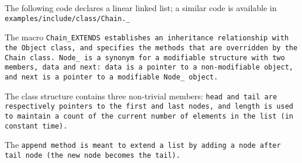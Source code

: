 The following code declares a linear linked list;
a similar code is available in \tt{examples/include/class/Chain._}


The macro \tt{Chain_EXTENDS} establishes an inheritance
relationship with the \tt{Object} class, and specifies
the methods that are overridden by the \tt{Chain} class.
\tt{Node_} is a synonym for a modifiable structure with two members,
\tt{data} and \tt{next}: \tt{data} is a pointer to a non-modifiable
object, and \tt{next} is a pointer to a modifiable \tt{Node_} object.

The class structure contains three non-trivial members: \tt{head} and \tt{tail}
are respectively pointers to the first and last nodes, and \tt{length} is used to
maintain a count of the current number of elements in the list (in constant time).

The \tt{append} method is meant to extend a list by adding
a node after tail node (the new node becomes the tail).
